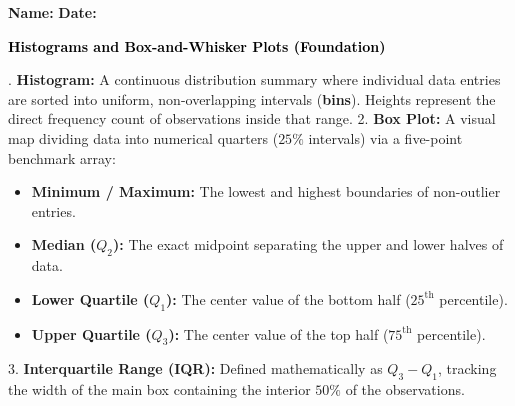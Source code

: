 \documentclass[12pt, letterpaper, fleqn]{article}
\begin{document}
\textbf{Name:} \underline{\hspace{5cm}}
\hfill
\textbf{Date:} \underline{\hspace{3cm}}\\

\begin{tcolorbox}[colback=black!10]
    \large\textcolor{black}{\textbf{Histograms and Box-and-Whisker Plots (Foundation)}}
\end{tcolorbox}

\vspace{1mm}

. \textbf{Histogram:} A continuous distribution summary where individual data entries are sorted into uniform, non-overlapping intervals (\textbf{bins}). Heights represent the direct frequency count of observations inside that range.
2. \textbf{Box Plot:} A visual map dividing data into numerical quarters ($25\%$ intervals) via a five-point benchmark array:
\begin{itemize}[noitemsep, leftmargin=0.5cm]
    \item \textbf{Minimum / Maximum:} The lowest and highest boundaries of non-outlier entries.
    \item \textbf{Median ($Q_2$):} The exact midpoint separating the upper and lower halves of data.
    \item \textbf{Lower Quartile ($Q_1$):} The center value of the bottom half ($25^{\text{th}}$ percentile).
    \item \textbf{Upper Quartile ($Q_3$):} The center value of the top half ($75^{\text{th}}$ percentile).
\end{itemize}
3. \textbf{Interquartile Range (IQR):} Defined mathematically as $Q_3 - Q_1$, tracking the width of the main box containing the interior $50\%$ of the observations.

\vspace{2mm}
\end{document}
